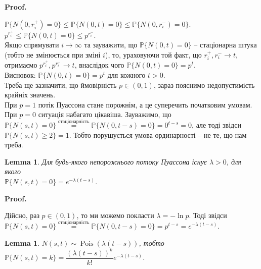 \documentclass[a4paper, 10pt]{article}
\makeatletter
\theoremstyle{theoremdd}
\newtheorem{lemma}[theorem]{Lemma}
\renewenvironment{proof}[1][Proof.\\]{\par
\pushQED{\hfill \qed}%
\normalfont \topsep6\p@\@plus6\p@\relax
\trivlist
\item\relax
{\bfseries
#1\@addpunct{.}}\hspace\labelsep\ignorespaces
}{%
\popQED\endtrivlist\@endpefalse
}
\DeclareMathOperator{\Pois}{Pois}
\makeatother
\begin{document}
\begin{proof}
$\mathbb{P}\{N(0,r_i^+) = 0\} \leq \mathbb{P}\{N(0,t) = 0\} \leq \mathbb{P}\{N(0,r_i^-) = 0\}$.\\
$p^{r_i^+} \leq \mathbb{P}\{N(0,t) = 0\} \leq p^{r_i^-}$.\\
Якщо спрямувати $i \to \infty$ та зауважити, що $\mathbb{P}\{N(0,t) = 0\}$ -- стаціонарна штука (тобто не змінюється при зміні $i$), то, ураховуючи той факт, що $r_i^+,r_i^- \to t$, отримаємо $p^{r_i^+}, p^{r_i^-} \to t$, внаслідок чого $\mathbb{P}\{N(0,t) = 0\} = p^t$.\\
Висновок: $\mathbb{P}\{N(0,t) = 0\} = p^t$ для кожного $t > 0$.\\
Треба ще зазначити, що ймовірність $p \in (0,1)$, зараз пояснимо недопустимість крайніх значень.\\
При $p = 1$ потік Пуассона стане порожнім, а це суперечить початковим умовам.\\
При $p = 0$ ситуація набагато цікавіша. Зауважимо, що $\mathbb{P}\{N(s,t) = 0\} \overset{\text{стаціонарність}}{=} \mathbb{P}\{N(0,t-s) = 0 \} = 0^{t-s} = 0$, але тоді звідси $\mathbb{P}\{N(s,t) \geq 2\} = 1$. Тобто порушується умова ординарності -- не те, що нам треба.
\end{proof}

\begin{lemma}
Для будь-якого непорожнього потоку Пуассона існує $\lambda > 0$, для якого \\ $\mathbb{P}\{N(s,t) = 0\} = e^{-\lambda(t-s)}$.
\end{lemma}

\begin{proof}
Дійсно, раз $p \in (0,1)$, то ми можемо покласти $\lambda = -\ln p$.  Тоді звідси\\
$\mathbb{P}\{N(s,t) = 0\} \overset{\text{стаціонарність}}{=} \mathbb{P}\{N(0,t-s) = 0\} = p^{t-s} = e^{-\lambda(t-s)}$.
\end{proof}

\begin{lemma}
$N(s,t) \sim \Pois(\lambda(t-s))$, тобто $\mathbb{P}\{N(s,t) = k\} = \dfrac{(\lambda(t-s))^k}{k!} e^{-\lambda(t-s)}$.
\end{lemma}
\end{document}
